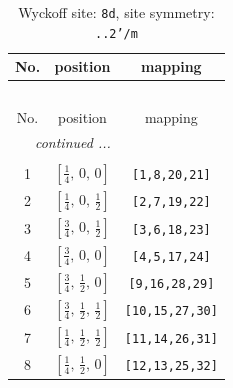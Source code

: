 \documentclass[fleqn,8pt]{jsarticle}
\begin{document}
\begin{longtable}{ccc}
\caption{Wyckoff site: {\tt 8d}, site symmetry: {\tt ..2'/m}}
 \\
 \hline \hline
No. & position & mapping \\ \hline \endfirsthead

\multicolumn{2}{l}{\tablename\ \thetable{}} \\
 \hline \hline
No. & position & mapping \\ \hline \endhead

 \hline \hline
\multicolumn{2}{r}{\footnotesize\it continued ...} \\ \endfoot

 \hline \hline
\multicolumn{2}{r}{} \\ \endlastfoot

1 & $\left[ \frac{1}{4},\, 0,\, 0 \right]$ & {\tt [1,8,20,21]} \\ \hline
2 & $\left[ \frac{1}{4},\, 0,\, \frac{1}{2} \right]$ & {\tt [2,7,19,22]} \\ \hline
3 & $\left[ \frac{3}{4},\, 0,\, \frac{1}{2} \right]$ & {\tt [3,6,18,23]} \\ \hline
4 & $\left[ \frac{3}{4},\, 0,\, 0 \right]$ & {\tt [4,5,17,24]} \\ \hline
5 & $\left[ \frac{3}{4},\, \frac{1}{2},\, 0 \right]$ & {\tt [9,16,28,29]} \\ \hline
6 & $\left[ \frac{3}{4},\, \frac{1}{2},\, \frac{1}{2} \right]$ & {\tt [10,15,27,30]} \\ \hline
7 & $\left[ \frac{1}{4},\, \frac{1}{2},\, \frac{1}{2} \right]$ & {\tt [11,14,26,31]} \\ \hline
8 & $\left[ \frac{1}{4},\, \frac{1}{2},\, 0 \right]$ & {\tt [12,13,25,32]} \\
\end{longtable}
\renewcommand{\arraystretch}{1.2}
\end{document}
